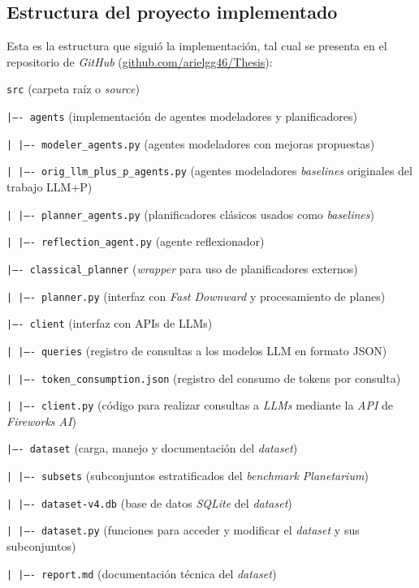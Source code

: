 \begin{anexes}
\section*{Estructura del proyecto implementado}

Esta es la estructura que siguió la implementación, tal cual se presenta en el repositorio de \textit{GitHub} (\href{https://github.com/arielgg46/Thesis}{github.com/arielgg46/Thesis}):

\texttt{src} (carpeta raíz o \textit{source})

\texttt{|---- agents} (implementación de agentes modeladores y planificadores)

\texttt{|   |---- modeler\_agents.py} (agentes modeladores con mejoras propuestas)

\texttt{|   |---- orig\_llm\_plus\_p\_agents.py} (agentes modeladores \textit{baselines} originales del trabajo LLM+P)

\texttt{|   |---- planner\_agents.py} (planificadores clásicos usados como \textit{baselines})

\texttt{|   |---- reflection\_agent.py} (agente reflexionador)

\texttt{|---- classical\_planner} (\textit{wrapper} para uso de planificadores externos)

\texttt{|   |---- planner.py} (interfaz con \textit{Fast Downward} y procesamiento de planes)

\texttt{|---- client} (interfaz con APIs de LLMs)

\texttt{|   |---- queries} (registro de consultas a los modelos LLM en formato JSON)

\texttt{|   |---- token\_consumption.json} (registro del consumo de tokens por consulta)

\texttt{|   |---- client.py} (código para realizar consultas a \textit{LLMs} mediante la \textit{API} de \textit{Fireworks AI})

\texttt{|---- dataset} (carga, manejo y documentación del \textit{dataset})

\texttt{|   |---- subsets} (subconjuntos estratificados del \textit{benchmark Planetarium})

\texttt{|   |---- dataset-v4.db} (base de datos \textit{SQLite} del \textit{dataset})

\texttt{|   |---- dataset.py} (funciones para acceder y modificar el \textit{dataset} y sus subconjuntos)

\texttt{|   |---- report.md} (documentación técnica del \textit{dataset})


\end{anexes}
